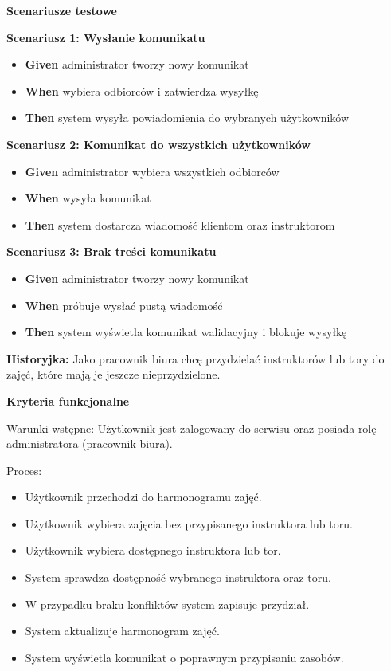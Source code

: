 \documentclass[a4paper,12pt]{article}
\begin{document}
\noindent \textbf{Scenariusze testowe}

\textbf{Scenariusz 1: Wysłanie komunikatu}
\begin{itemize}
    \item \textbf{Given} administrator tworzy nowy komunikat
    \item \textbf{When} wybiera odbiorców i zatwierdza wysyłkę
    \item \textbf{Then} system wysyła powiadomienia do wybranych użytkowników
\end{itemize}

\textbf{Scenariusz 2: Komunikat do wszystkich użytkowników}
\begin{itemize}
    \item \textbf{Given} administrator wybiera wszystkich odbiorców
    \item \textbf{When} wysyła komunikat
    \item \textbf{Then} system dostarcza wiadomość klientom oraz instruktorom
\end{itemize}

\textbf{Scenariusz 3: Brak treści komunikatu}
\begin{itemize}
    \item \textbf{Given} administrator tworzy nowy komunikat
    \item \textbf{When} próbuje wysłać pustą wiadomość
    \item \textbf{Then} system wyświetla komunikat walidacyjny i blokuje wysyłkę
\end{itemize}

\vspace{0,5cm}

\noindent \textbf{Historyjka:} Jako pracownik biura chcę przydzielać instruktorów lub tory do zajęć, które mają je jeszcze nieprzydzielone.

\vspace{0,2cm}

\noindent \textbf{Kryteria funkcjonalne}

\vspace{0,2cm}

\noindent Warunki wstępne: Użytkownik jest zalogowany do serwisu oraz posiada rolę administratora (pracownik biura).

\vspace{0,2cm}

\noindent Proces:

\begin{itemize}
    \item Użytkownik przechodzi do harmonogramu zajęć.
    \item Użytkownik wybiera zajęcia bez przypisanego instruktora lub toru.
    \item Użytkownik wybiera dostępnego instruktora lub tor.
    \item System sprawdza dostępność wybranego instruktora oraz toru.
    \item W przypadku braku konfliktów system zapisuje przydział.
    \item System aktualizuje harmonogram zajęć.
    \item System wyświetla komunikat o poprawnym przypisaniu zasobów.
\end{itemize}
\end{document}
